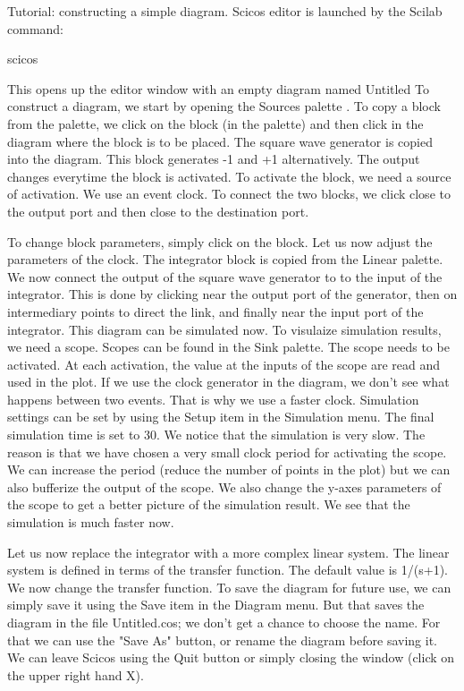 Tutorial: constructing a simple diagram.
Scicos editor is launched by the Scilab command:

scicos

This opens up the editor window with an empty diagram
named Untitled
To construct a diagram, we start by opening the
Sources palette .
To copy a block from the palette, we click on the
block (in the palette) and then click in the diagram
where the block is to be placed.
The square wave generator is copied into
the diagram. This block generates -1 and +1
alternatively. The output changes everytime
the block is activated. To activate the block,
we need a source of activation. We use an event
clock.
To connect the two blocks, we click close to the
output port and then close to the destination port.

To change block parameters, simply click on the block.
Let us now adjust the parameters of the clock.
The integrator block is copied from the Linear palette.
We now connect the output of the square wave generator to
to the input of the integrator.
This is done by clicking near the output port of the generator,
then on intermediary points to direct the link, and finally
near the input port of the integrator.
This diagram can be simulated now. To visulaize simulation results,
we need a scope. Scopes can be found in the Sink palette.
The scope needs to be activated. At each activation,
the value at the inputs of the scope are read and
used in the plot. If we use the clock generator in
the diagram, we don't see what happens between two
events. That is why we use a faster clock.
Simulation settings can be set by using the
Setup item in the Simulation menu. The final
simulation time is set to 30.
We notice that the simulation is very slow. The reason
is that we have chosen a very small clock period for
activating the scope. We can increase the period (reduce
the number of points in the plot) but we can also bufferize
the output of the scope. We also change the y-axes parameters
of the scope to get a better picture of the simulation result.
We see that the simulation is much faster now.

Let us now replace the integrator with a more
complex linear system.
The linear system is defined in terms
of the transfer function. The default
value is 1/(s+1).
We now change the transfer function.
To save the diagram for future use, we can simply save it
using the Save item in the Diagram menu. But that saves the
diagram in the file Untitled.cos; we don't get a chance to
choose the name. For that we can use the "Save As" button,
or rename the diagram before saving it.
We can leave Scicos using the Quit button or
simply closing the window (click on the upper
right hand X).
